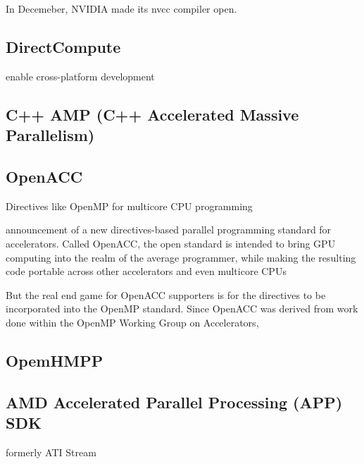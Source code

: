 In Decemeber, NVIDIA made its nvcc compiler open.

\subsection{DirectCompute}
enable cross-platform development

\subsection{C++ AMP (C++ Accelerated Massive Parallelism)}


\subsection{OpenACC}
Directives like OpenMP for multicore CPU programming

announcement of a new directives-based parallel programming standard for accelerators.  Called OpenACC, the open standard is intended to bring GPU computing into the realm of the average programmer, while making the resulting code portable across other accelerators and even multicore CPUs

But the real end game for OpenACC supporters is for the directives to be incorporated into the OpenMP standard.  Since OpenACC was derived from work done within the OpenMP Working Group on Accelerators,

\subsection{OpemHMPP}

\subsection{AMD Accelerated Parallel Processing (APP) SDK}
formerly ATI Stream





